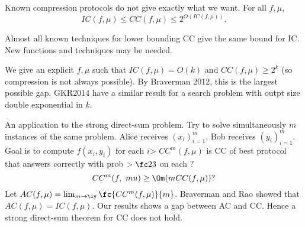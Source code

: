 Known compression protocols do not give exactly what we want. 
For all $f,\mu$, 
\[IC(f,\mu)\le CC(f,\mu)\le 2^{O(IC(f,\mu))}.\]

Almost all known techniques for lower bounding CC give the same bound for IC. New functions and techniques may be needed.

We give an explicit $f,\mu$ such that $IC(f,\mu)=O(k)$ and $CC(f,\mu)\ge 2^k$ (so compression is not always possible). By Braverman 2012, this is the largest possible gap. GKR2014 have a similar result for a search problem with outpt size double exponential in $k$.


An application to the strong direct-sum problem.
Try to solve simultaneously $m$ instances of the same problem. Alice receives $(x_i)_{i=1}^m$, Bob receives $(y_i)_{i=1}^m$. Goal is to compute $f(x_i,y_i)$ for each $i$> $CC^m(f,\mu)$ is CC of best protocol that answers correctly with prob $>\fc 23$ on each ?
\[
CC^m(f,\
mu)\ge \Om(m CC(f,\mu))?
\]
Let $AC(f,\mu)=\lim_{m\to \iy}\fc{CC^m(f,\mu)}{m}$. 
Braverman and Rao showed that $AC(f,\mu)=IC(f,\mu)$. 
Our results shows a gap between AC and CC. Hence a strong direct-sum theorem for CC does not hold.


